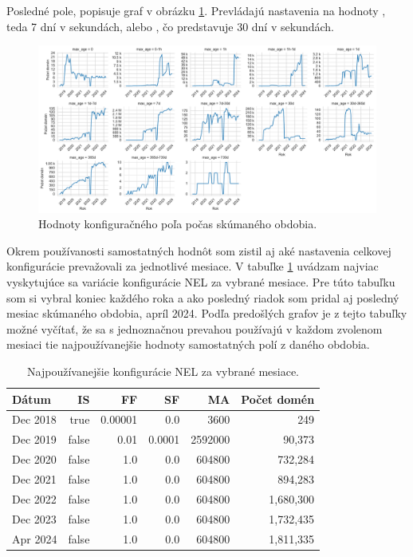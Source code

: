 Posledné pole,  popisuje graf v obrázku \ref{fig:httparchive-nel-config-ma-dist}.
Prevládajú nastavenia na hodnoty , teda 7 dní v sekundách, alebo , čo predstavuje 30 dní v sekundách.

\begin{figure}[!htb]
\begin{center}
 \includegraphics[scale=0.447]{obrazky-figures/httparchive_nel_config_ma_dist.pdf}
 \caption{\centering Hodnoty konfiguračného poľa  počas skúmaného obdobia.}
 \label{fig:httparchive-nel-config-ma-dist}
\end{center}
\end{figure}

Okrem používanosti samostatných hodnôt som zistil aj aké nastavenia celkovej konfigurácie prevažovali za jednotlivé mesiace.
V tabuľke \ref{tab:nel_config_popular_annual_config} uvádzam najviac vyskytujúce sa variácie konfigurácie NEL za vybrané mesiace.
Pre túto tabuľku som si vybral koniec každého roka a ako posledný riadok som pridal aj posledný mesiac skúmaného obdobia, apríl 2024.
Podľa predošlých grafov je z tejto tabuľky možné vyčítať, že sa s jednoznačnou prevahou používajú v každom zvolenom mesiaci tie najpoužívanejšie hodnoty samostatných polí z daného obdobia.

\begin{table}[!htb]
\centering
\begin{tabular}{l||r|r|r|r|r}
\toprule
Dátum & IS & FF & SF & MA & Počet domén \\
\midrule
\midrule
Dec 2018 & true & 0.00001 & 0.0 & 3600 & 249 \\
Dec 2019 & false & 0.01 & 0.0001 & 2592000 & 90,373 \\
Dec 2020 & false & 1.0 & 0.0 & 604800 & 732,284 \\
Dec 2021 & false & 1.0 & 0.0 & 604800 & 894,283 \\
Dec 2022 & false & 1.0 & 0.0 & 604800 & 1,680,300 \\
Dec 2023 & false & 1.0 & 0.0 & 604800 & 1,732,435 \\
Apr 2024 & false & 1.0 & 0.0 & 604800 & 1,811,335 \\
\bottomrule
\end{tabular}
\label{tab:nel_config_popular_annual_config}
\caption{Najpoužívanejšie konfigurácie NEL za vybrané mesiace.}
\end{table}


